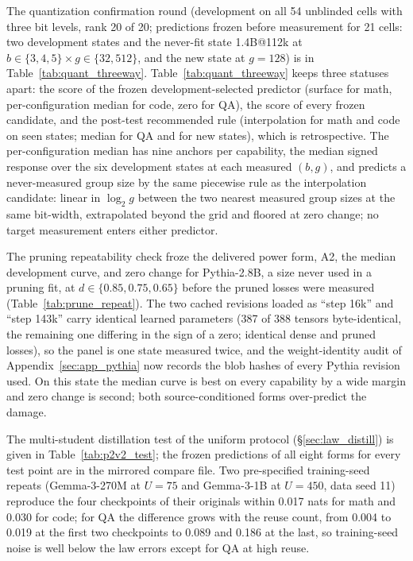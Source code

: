 



The quantization confirmation round (development on all 54 unblinded
cells with three bit levels, rank 20 of 20; predictions frozen before
measurement for 21 cells: two development states and the never-fit
state 1.4B@112k at $b\in\{3,4,5\}\times g\in\{32,512\}$, and the new
state at $g=128$) is in Table~\ref{tab:quant_threeway}. Table~\ref{tab:quant_threeway} keeps three statuses apart: the
score of the frozen development-selected predictor (surface for math,
per-configuration median for code, zero for QA), the score of every
frozen candidate, and the post-test recommended rule (interpolation
for math and code on seen states; median for QA and for new states),
which is retrospective. The per-configuration median has nine anchors
per capability, the median signed response over the six development
states at each measured $(b,g)$, and predicts a never-measured group
size by the same piecewise rule as the interpolation candidate:
linear in $\log_2 g$ between the two nearest measured group sizes at
the same bit-width, extrapolated beyond the grid and floored at zero
change; no target measurement enters either predictor.


The pruning repeatability check froze the delivered power form, A2,
the median development curve, and zero change for Pythia-2.8B, a size
never used in a pruning fit, at $d\in\{0.85,0.75,0.65\}$ before the
pruned losses were measured (Table~\ref{tab:prune_repeat}). The two
cached revisions loaded as ``step 16k'' and ``step 143k'' carry
identical learned parameters (387 of 388 tensors byte-identical, the
remaining one differing in the sign of a zero; identical dense and
pruned losses), so the panel is one state measured twice, and the
weight-identity audit of Appendix~\ref{sec:app_pythia} now records
the blob hashes of every Pythia revision used. On this state the
median curve is best on every capability by a wide margin and zero
change is second; both source-conditioned forms over-predict the
damage.


The multi-student distillation test of the uniform protocol
(\S\ref{sec:law_distill}) is given in Table~\ref{tab:p2v2_test}; the
frozen predictions of all eight forms for every test point are in the
mirrored compare file. Two pre-specified training-seed repeats
(Gemma-3-270M at $U{=}75$ and Gemma-3-1B at $U{=}450$, data seed 11)
reproduce the four checkpoints of their originals within 0.017 nats
for math and 0.030 for code; for QA the difference grows with the
reuse count, from 0.004 to 0.019 at the first two checkpoints to 0.089
and 0.186 at the last, so training-seed noise is well below the law
errors except for QA at high reuse.





